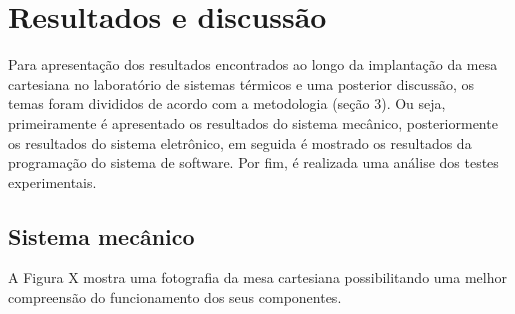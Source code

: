 \chapter{Resultados e discussão}
\label{chap:resultados}

Para apresentação dos resultados encontrados ao longo da implantação da mesa cartesiana no 
laboratório de sistemas térmicos e uma posterior discussão, os temas foram divididos de acordo 
com a metodologia (seção 3). Ou seja, primeiramente é apresentado os resultados do sistema mecânico, 
posteriormente os resultados do sistema eletrônico, em seguida é mostrado os resultados da programação 
do sistema de software. Por fim, é realizada uma análise dos testes experimentais.

\section{Sistema mecânico}\label{sec:resmecanico}

A Figura X mostra uma fotografia da mesa cartesiana possibilitando uma melhor compreensão do funcionamento 
dos seus componentes.

%
%

